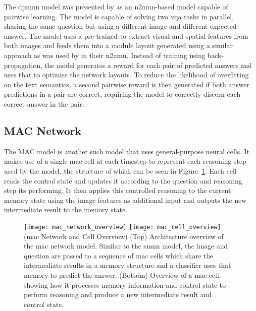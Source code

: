 The \gls{dpnmn} model was presented by \citeauthor{su_toward_2020} \cite{su_toward_2020} as an \gls{n2nmn}-based model capable of pairwise learning.
The model is capable of solving two \gls{vqa} tasks in parallel, sharing the same question but using a different image and different expected answer.
The model uses a pre-trained  to extract visual and spatial features from both images and feeds them into a module layout generated using a similar approach as was used by \citeauthor{hu_learning_2017} in their \gls{n2nmn}.
Instead of training using back-propagation, the model generates a reward for each pair of predicted answers and uses that to optimise the network layouts.
To reduce the likelihood of overfitting on the text semantics, a second pairwise reward is then generated if both answer predictions in a pair are correct, requiring the model to correctly discern each correct answer in the pair.

\subsection{MAC Network}
\label{subsec:mac_network}

The MAC model \cite{hudson_compositional_2018} is another such model that uses general-purpose neural cells.
It makes use of a single \gls{mac} cell at each timestep to represent each reasoning step used by the model, the structure of which can be seen in Figure~\ref{fig:mac_network_and_cell_overview}.
Each cell reads the control state and updates it according to the question and reasoning step its performing.
It then applies this controlled reasoning to the current memory state using the image features as additional input and outputs the new intermediate result to the memory state.

\begin{figure}[htbp]
    \centering
    \texttt{[image: mac\_network\_overview]}
    \texttt{[image: mac\_cell\_overview]}
    \captionsource(\acrshort{mac} Network and Cell Overview)
        {(Top) Architecture overview of the \acrshort{mac} network model. Similar to the \gls{snmn} model, the image and question are passed to a sequence of \acrshort{mac} cells which share the intermediate results in a memory structure and a classifier uses that memory to predict the answer. (Bottom) Overview of a \acrshort{mac} cell, showing how it processes memory information and control state to perform reasoning and produce a new intermediate result and control state.\label{fig:mac_network_and_cell_overview}}
        {\citeauthor{hudson_compositional_2018}\cite{hudson_compositional_2018}}
\end{figure}

